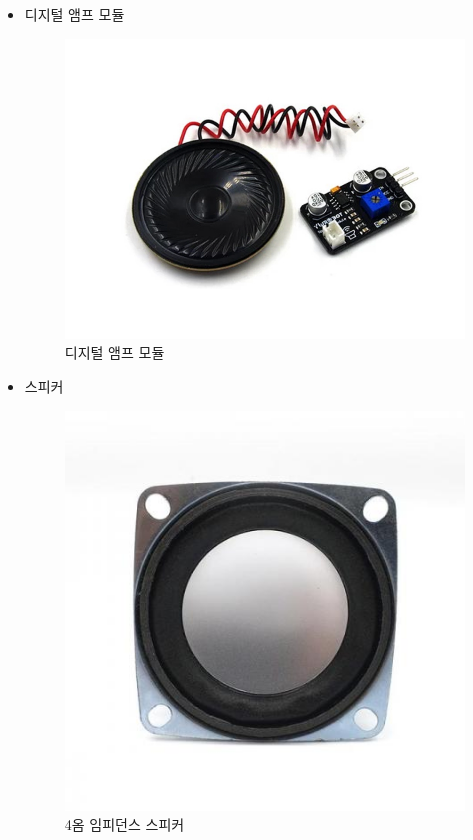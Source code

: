 \documentclass[a4paper,11pt]{article}
\begin{document}
\begin{spacing}{1.6}
\begin{itemize}
  \item 디지털 앰프 모듈
\begin{figure}[hbt!]
\centering
\includegraphics[scale=0.45]{m2.jpg}
\caption{디지털 앰프 모듈}
\label{Fig:Fig02}
\end{figure}

  \item 스피커
\begin{figure}[hbt!]
\centering
\includegraphics[scale=0.5]{m3.jpg}
\caption{4옴 임피던스 스피커}
\label{Fig:Fig03}
\end{figure}


\end{itemize}
\end{spacing}
\end{document}
